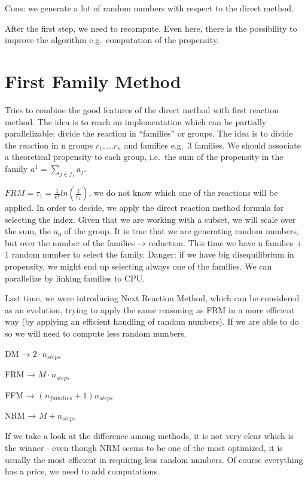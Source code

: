 Cons: we generate a lot of random numbers with respect to the direct
method.

After the first step, we need to recompute. Even here, there is the
possibility to improve the algorithm e.g.~computation of the propensity.

\hypertarget{first-family-method}{%
\section{First Family Method}\label{first-family-method}}

Tries to combine the good features of the direct method with first
reaction method. The idea is to reach an implementation which can be
partially parallelizable: divide the reaction in ``families'' or groups.
The idea is to divide the reaction in n groups $r_1,…r_n$ and families
e.g.~3 families. We should associate a theoretical propensity to each
group, i.e.~the sum of the propensity in the family
$a^1=\sum_{j\in f_1}a_j$.

$FRM= \tau_1= \frac{1}{e^1}ln(\frac{1}{r_1})$, we do not know which one
of the reactions will be applied. In order to decide, we apply the
direct reaction method formula for selecting the index. Given that we
are working with a subset, we will scale over the sum, the $a_0$ of the
group. It is true that we are generating random numbers, but over the
number of the families → reduction. This time we have n families + 1
random number to select the family. Danger: if we have big
disequilibrium in propensity, we might end up selecting always one of
the families. We can parallelize by linking families to CPU.

Last time, we were introducing Next Reaction Method, which can be
considered as an evolution, trying to apply the same reasoning as FRM in
a more efficient way (by applying an efficient handling of random
numbers). If we are able to do so we will need to compute less random
numbers.

DM → $2 \cdot n_{steps}$

FRM → $M \cdot n_{steps}$

FFM → $(n_{families} + 1)n_{steps}$

NRM → $M+n_{steps}$

If we take a look at the difference among methods, it is not very clear
which is the winner - even though NRM seems to be one of the most
optimized, it is usually the most efficient in requiring less random
numbers. Of course everything has a price, we need to add computations.

